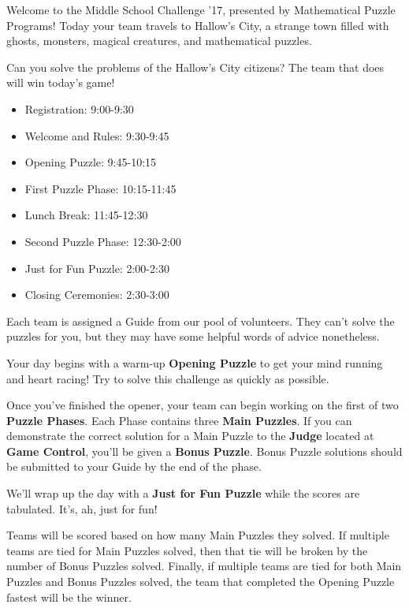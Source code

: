 

Welcome to the Middle School Challenge '17, presented by Mathematical
Puzzle Programs! Today your team travels to Hallow's City, a strange town
filled with ghosts, monsters, magical creatures, and
mathematical puzzles.

Can you solve the problems of the Hallow's City citizens? The team that
does will win today's game!


\begin{itemize}
  \item Registration: 9:00-9:30
  \item Welcome and Rules: 9:30-9:45
  \item Opening Puzzle: 9:45-10:15
  \item First Puzzle Phase: 10:15-11:45
  \item Lunch Break: 11:45-12:30
  \item Second Puzzle Phase: 12:30-2:00
  \item Just for Fun Puzzle: 2:00-2:30
  \item Closing Ceremonies: 2:30-3:00
\end{itemize}


Each team is assigned a Guide from our pool of volunteers. They can't solve
the puzzles for you, but they may have some helpful words of advice nonetheless.


Your day begins with a warm-up \textbf{Opening Puzzle} to get your mind running
and heart racing! Try to solve this challenge as quickly as possible.

Once you've finished the opener, your team can begin working on the first of two
\textbf{Puzzle Phases}. Each Phase contains three \textbf{Main Puzzles}.
If you can demonstrate the correct solution for a Main Puzzle
to the \textbf{Judge} located
at \textbf{Game Control}, you'll be given a \textbf{Bonus Puzzle}.
Bonus Puzzle solutions should be submitted to your Guide by the end of
the phase.

We'll wrap up the day with a \textbf{Just for Fun Puzzle} while the scores
are tabulated. It's, ah, just for fun!


Teams will be scored based on how many Main Puzzles they solved.
If multiple teams are tied for Main Puzzles solved, then that tie will be broken
by the number of Bonus Puzzles solved. Finally, if multiple teams are tied
for both Main Puzzles and Bonus Puzzles solved, the team that completed the
Opening Puzzle fastest will be the winner.

